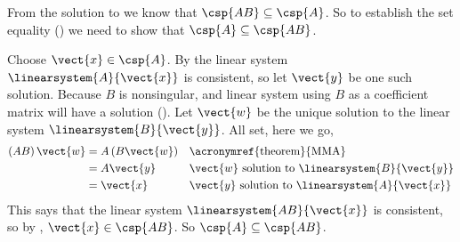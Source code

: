 From the solution to  we know that $\csp{AB}\subseteq\csp{A}$.  So to establish the set equality () we need to show that $\csp{A}\subseteq\csp{AB}$.\par
%
Choose $\vect{x}\in\csp{A}$.  By  the linear system $\linearsystem{A}{\vect{x}}$ is consistent, so let $\vect{y}$ be one such solution.  Because $B$ is nonsingular, and linear system using $B$ as a coefficient matrix will have a solution ().  Let $\vect{w}$ be the unique solution to the linear system $\linearsystem{B}{\vect{y}}$.  All set, here we go,
%
\begin{align*}
\left(AB\right)\vect{w}
&=A\left(B\vect{w}\right)&&\text{\acronymref{theorem}{MMA}}\\
&=A\vect{y}&&\text{$\vect{w}$ solution to $\linearsystem{B}{\vect{y}}$}\\
&=\vect{x}&&\text{$\vect{y}$ solution to $\linearsystem{A}{\vect{x}}$}\\
\end{align*}
%
This says that the linear system $\linearsystem{AB}{\vect{x}}$ is consistent, so by , $\vect{x}\in\csp{AB}$.  So $\csp{A}\subseteq\csp{AB}$.